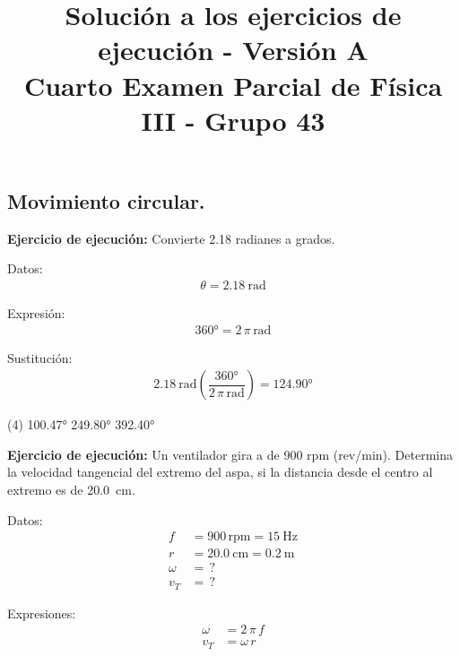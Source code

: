 \documentclass[12pt, letter]{exam}
\date{}
\title{Solución a los ejercicios de ejecución - Versión A \\ Cuarto Examen Parcial de Física III - Grupo 43}
\begin{document}
\maketitle

\setcounter{page}{2}

\begin{questions}
    \section{Movimiento circular.}

    \setcounter{question}{4} \question \textbf{Ejercicio de ejecución: } Convierte 2.18 radianes a grados.

    \begin{minipage}[t]{0.35\linewidth}
    Datos: 
    \begin{align*}
    \theta = \SI{2.18}{\radian}
    \end{align*}
    \end{minipage}
    \hspace{1cm}
    \begin{minipage}[t]{0.4\linewidth}
    Expresión:
    \begin{align*}
    \ang{360} = 2 \, \pi \, \unit{\radian}
    \end{align*}
    \end{minipage}

    Sustitución:
    \begin{align*}
    \SI{2.18}{\radian} \left( \dfrac{\ang{360}}{2 \, \pi \, \unit{\radian}} \right) = \ang{124.90}
    \end{align*}

    \vspace{0.3cm}
    \begin{tasks}(4)
        \task \ang{100.47}
        \task {}
        \task \ang{249.80}
        \task \ang{392.40}
    \end{tasks}
    \question \label{Ejercicio_02} \textbf{Ejercicio de ejecución: } Un ventilador gira a de 900 rpm (rev/min). Determina la velocidad tangencial del extremo del aspa, si la distancia desde el centro al extremo es de \SI{20.0}{\centi\meter}.

    \begin{minipage}[t]{0.4\linewidth}
    Datos: 
    \begin{align*}
    f &= 900 \, \text{rpm} = \SI{15}{\hertz} \\
    r &= \SI{20.0}{\centi\meter} = \SI{0.2}{\meter} \\
    \omega &= \, ? \\
    v_{T} &= \, ?
    \end{align*}
    \end{minipage}
    \hspace{1cm}
    \begin{minipage}[t]{0.4\linewidth}
    Expresiones:
    \begin{align*}
    \omega &= 2 \, \pi \, f \\
    v_{T} &= \omega \, r
    \end{align*}
    \end{minipage}


\end{questions}
\end{document}
